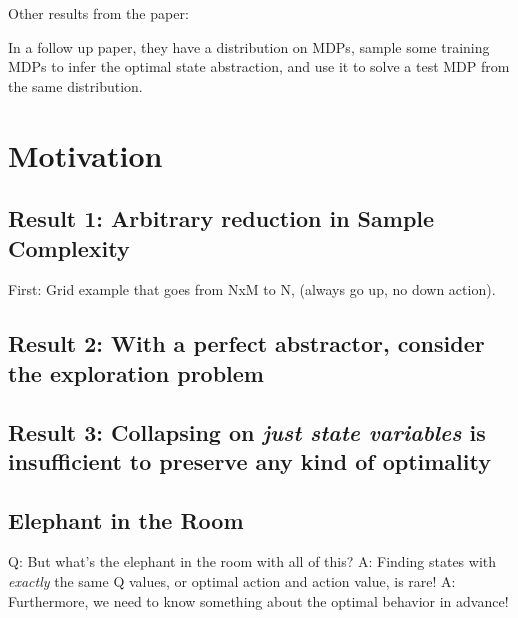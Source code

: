 \documentclass[11pt]{amsart}
\begin{document}
Other results from the paper:





In a follow up paper, they have a distribution on MDPs, sample some training MDPs to infer the optimal state abstraction, and use it to solve a test MDP from the same distribution.

\newpage
\section{Motivation}

\subsection{Result 1: Arbitrary reduction in Sample Complexity}
First: Grid example that goes from NxM to N, (always go up, no down action).

\subsection{Result 2: With a perfect abstractor, consider the exploration problem}

\subsection{Result 3: Collapsing on {\it just state variables} is insufficient to preserve any kind of optimality}

\subsection{Elephant in the Room}
Q: But what's the elephant in the room with all of this?
A: Finding states with {\it exactly} the same Q values, or optimal action and action value, is rare!
A: Furthermore, we need to know something about the optimal behavior in advance!
\end{document}

